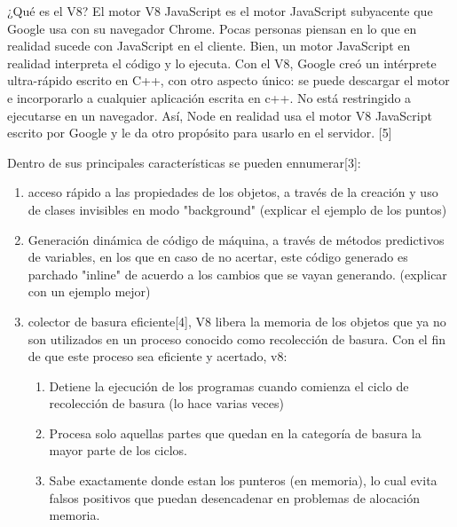 
¿Qué es el V8? El motor V8 JavaScript es el motor JavaScript subyacente que Google usa con su navegador
Chrome. 
Pocas personas piensan en lo que en realidad sucede con JavaScript en el cliente. Bien, un motor 
JavaScript en realidad interpreta el código y lo ejecuta. Con el V8, Google creó un intérprete ultra-rápido 
escrito en C++, con otro aspecto único: se puede descargar el motor e incorporarlo a cualquier aplicación escrita en c++. 
No está restringido a ejecutarse en un navegador. Así, Node en realidad usa el motor V8 JavaScript 
escrito por Google y le da otro propósito para usarlo en el servidor. [5]

Dentro de sus principales características se pueden ennumerar[3]:

\begin{enumerate}
 \item acceso rápido a las propiedades de los objetos, a través de la creación y uso de clases invisibles en modo "background"
(explicar el ejemplo de los puntos)
 \item Generación dinámica de código de máquina, a través de métodos predictivos de variables, en los que en caso de no acertar, 
 este código generado es parchado "inline" de acuerdo a los cambios que se vayan generando. (explicar con un ejemplo mejor)
 \item colector de basura eficiente[4], V8 libera la memoria de los objetos que ya no son utilizados en un proceso conocido como
 recolección de basura. Con el fin de que este proceso sea eficiente y acertado, v8:
    \begin{enumerate}
     \item Detiene la ejecución de los programas cuando comienza el ciclo de recolección de basura (lo hace varias veces)
     \item Procesa solo aquellas partes que quedan en la categoría de basura la mayor parte de los ciclos. 
     \item Sabe exactamente donde estan los punteros (en memoria), lo cual evita falsos positivos que 
    puedan desencadenar en problemas de alocación memoria.
    \end{enumerate}
\end{enumerate}


